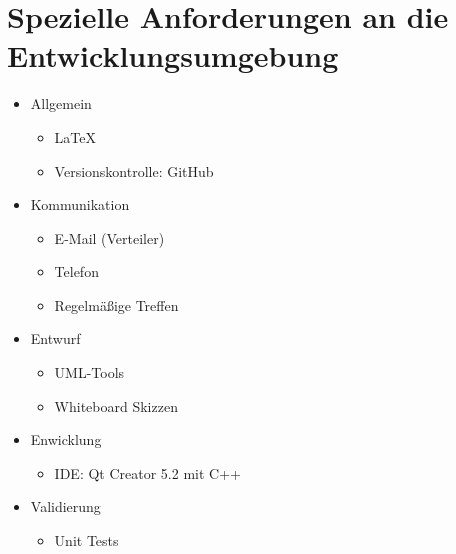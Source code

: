 \section{Spezielle Anforderungen an die Entwicklungsumgebung}

\begin{itemize}
  \item Allgemein
    \begin{itemize}
      \item \LaTeX
      \item Versionskontrolle: GitHub
    \end{itemize}
  \item Kommunikation
    \begin{itemize}
      \item E-Mail (Verteiler)
      \item Telefon
      \item Regelmäßige Treffen
    \end{itemize}
  \item Entwurf
    \begin{itemize}
      \item UML-Tools
      \item Whiteboard Skizzen
    \end{itemize}
  \item Enwicklung
    \begin{itemize}
      \item IDE: Qt Creator 5.2 mit C++
    \end{itemize}
  \item Validierung
    \begin{itemize}
      \item Unit Tests
    \end{itemize}
\end{itemize}


